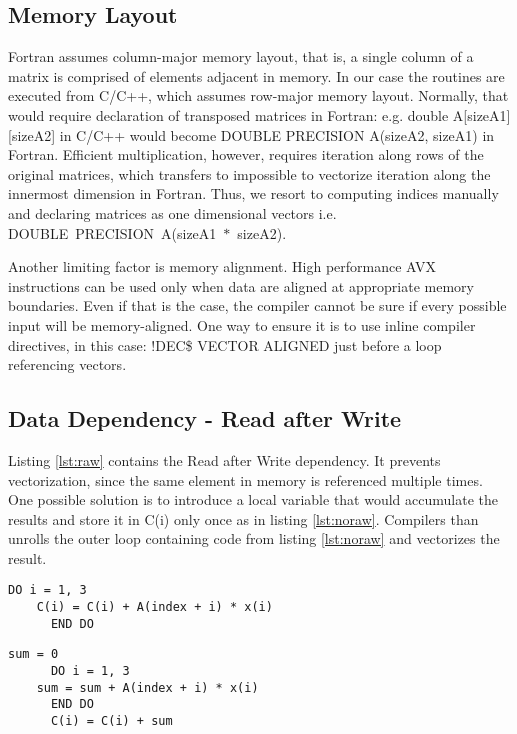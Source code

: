 \documentclass[journal, a4paper]{IEEEtran}
\begin{document}
  \subsection{Memory Layout}
    Fortran assumes column-major memory layout, that is, a single column of a matrix is comprised of elements adjacent in memory. In our case the routines are executed from C/C++, which assumes row-major memory layout. Normally, that would require declaration of transposed matrices in Fortran: e.g. double A[sizeA1][sizeA2] in C/C++ would become DOUBLE PRECISION A(sizeA2, sizeA1) in Fortran. Efficient multiplication, however, requires iteration along rows of the original matrices, which transfers to impossible to vectorize iteration along the innermost dimension in Fortran. Thus, we resort to computing indices manually and declaring matrices as one dimensional vectors i.e. DOUBLE~PRECISION~A(sizeA1~$*$~sizeA2).
    
    Another limiting factor is memory alignment. High performance AVX instructions can be used only when data are aligned at appropriate memory boundaries. Even if that is the case, the compiler cannot be sure if every possible input will be memory-aligned. One way to ensure it is to use inline compiler directives, in this case: !DEC\$ VECTOR ALIGNED just before a loop referencing vectors.
  
  \subsection{Data Dependency - Read after Write}
    Listing \ref{lst:raw} contains the Read after Write dependency. It prevents vectorization, since the same element in memory is referenced multiple times. One possible solution is to introduce a local variable that would accumulate the results and store it in C(i) only once as in listing \ref{lst:noraw}. Compilers than unrolls the outer loop containing code from listing \ref{lst:noraw} and vectorizes the result.
    \begin{lstlisting}[label=lst:raw, caption=Read after Write dependency.]
      DO i = 1, 3
	C(i) = C(i) + A(index + i) * x(i)
      END DO
    \end{lstlisting}
    
    \begin{lstlisting}[label=lst:noraw, caption=Read after Write dependency resolved.]
      sum = 0
      DO i = 1, 3
	sum = sum + A(index + i) * x(i)
      END DO
      C(i) = C(i) + sum
    \end{lstlisting}
    
\end{document}
